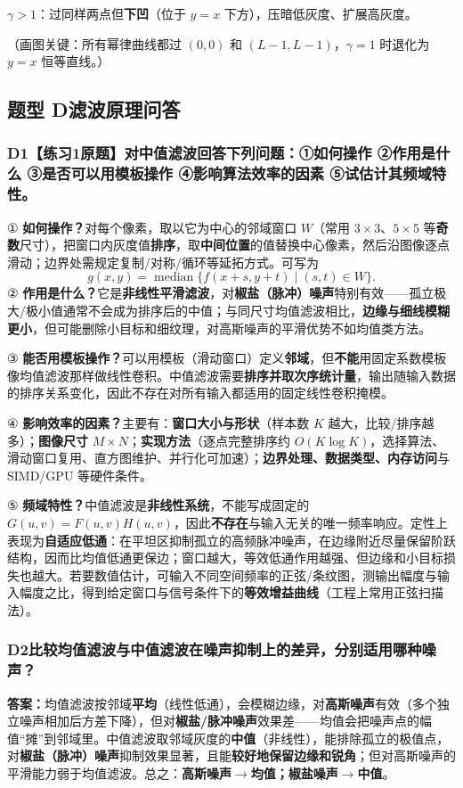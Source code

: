 $\gamma>1$：过同样两点但\textbf{下凹}（位于 $y=x$ 下方），压暗低灰度、扩展高灰度。

（画图关键：所有幂律曲线都过 $(0,0)$ 和 $(L-1,L-1)$，$\gamma=1$ 时退化为 $y=x$ 恒等直线。）

\subsection*{题型 D\quad 滤波原理问答}
\subsubsection*{D1【练习1原题】对中值滤波回答下列问题：①如何操作 ②作用是什么 ③是否可以用模板操作 ④影响算法效率的因素 ⑤试估计其频域特性。}
① \textbf{如何操作？}对每个像素，取以它为中心的邻域窗口 $W$（常用 $3\times3$、$5\times5$ 等\textbf{奇数}尺寸），把窗口内灰度值\textbf{排序}，取\textbf{中间位置}的值替换中心像素，然后沿图像逐点滑动；边界处需规定复制/对称/循环等延拓方式。可写为
\[
g(x,y)=\operatorname{median}\{f(x+s,y+t)\mid(s,t)\in W\}.
\]
② \textbf{作用是什么？}它是\textbf{非线性平滑滤波}，对\textbf{椒盐（脉冲）噪声}特别有效——孤立极大/极小值通常不会成为排序后的中值；与同尺寸均值滤波相比，\textbf{边缘与细线模糊更小}，但可能删除小目标和细纹理，对高斯噪声的平滑优势不如均值类方法。

③ \textbf{能否用模板操作？}可以用模板（滑动窗口）定义\textbf{邻域}，但\textbf{不能}用固定系数模板像均值滤波那样做线性卷积。中值滤波需要\textbf{排序并取次序统计量}，输出随输入数据的排序关系变化，因此不存在对所有输入都适用的固定线性卷积掩模。

④ \textbf{影响效率的因素？}主要有：\textbf{窗口大小与形状}（样本数 $K$ 越大，比较/排序越多）；\textbf{图像尺寸} $M\times N$；\textbf{实现方法}（逐点完整排序约 $O(K\log K)$，选择算法、滑动窗口复用、直方图维护、并行化可加速）；\textbf{边界处理、数据类型、内存访问}与 SIMD/GPU 等硬件条件。

⑤ \textbf{频域特性？}中值滤波是\textbf{非线性系统}，不能写成固定的 $G(u,v)=F(u,v)H(u,v)$，因此\textbf{不存在}与输入无关的唯一频率响应。定性上表现为\textbf{自适应低通}：在平坦区抑制孤立的高频脉冲噪声，在边缘附近尽量保留阶跃结构，因而比均值低通更保边；窗口越大，等效低通作用越强、但边缘和小目标损失也越大。若要数值估计，可输入不同空间频率的正弦/条纹图，测输出幅度与输入幅度之比，得到给定窗口与信号条件下的\textbf{等效增益曲线}（工程上常用正弦扫描法）。

\subsubsection*{D2\quad 比较均值滤波与中值滤波在噪声抑制上的差异，分别适用哪种噪声？}
\textbf{答案：}均值滤波按邻域\textbf{平均}（线性低通），会模糊边缘，对\textbf{高斯噪声}有效（多个独立噪声相加后方差下降），但对\textbf{椒盐/脉冲噪声}效果差——均值会把噪声点的幅值“摊”到邻域里。中值滤波取邻域灰度的\textbf{中值}（非线性），能排除孤立的极值点，对\textbf{椒盐（脉冲）噪声}抑制效果显著，且能\textbf{较好地保留边缘和锐角}；但对高斯噪声的平滑能力弱于均值滤波。总之：\textbf{高斯噪声$\to$均值；椒盐噪声$\to$中值}。

